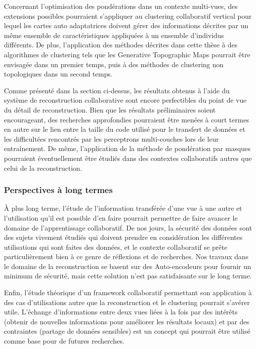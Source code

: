 Concernant l'optimisation des pondérations dans un contexte multi-vues, des extensions possibles pourraient s'appliquer au clustering collaboratif vertical pour lequel les cartes auto adaptatrices doivent gérer des informations décrites par un m\^{e}me ensemble de caractéristiques appliquées à un ensemble d'individus différents. De plus, l'application des méthodes décrites dans cette thèse à des algorithmes de clustering tels que les Generative Topographic Maps pourrait \^{e}tre envisagée dans un premier temps, puis à des méthodes de clustering non topologiques dans un second temps.

Comme présenté dans la section ci-dessus, les résultats obtenus à l'aide du système de reconstruction collaborative sont encore perfectibles du point de vue du détail de reconstruction. Bien que les résultats préliminaires soient encourageant, des recherches approfondies pourraient \^{e}tre menées à court termes en autre sur le lien entre la taille du code utilisé pour le transfert de données et les difficultées rencontrés par les perceptrons multi-couches lors de leur entraînement. De m\^{e}me, l'application de la méthode de pondération par masques pourraient éventuellement \^{e}tre étudiés dans des contextes collaboratifs autres que celui de la reconstruction.

\subsubsection{Perspectives à long termes}
À plus long terme, l'étude de l'information transférée d'une vue à une autre et l'utilisation qu'il est possible d'en faire pourrait permettre de faire avancer le domaine de l'apprentissage collaboratif. De nos jours, la sécurité des données sont des sujets vivement étudiés qui doivent prendre en considération les différentes utilisations qui sont faites des données, et le contexte collaboratif se pr\^{e}te particulièrement bien à ce genre de réflexions et de recherches. Nos travaux dans le domaine de la reconstruction se basent sur des Auto-encodeurs pour fournir un minimum de sécurité, mais cette solution n'est pas satisfaisante sur le long terme.

Enfin, l'étude théorique d'un framework collaboratif permettant son application à des cas d'utilisations autre que la reconstruction et le clustering pourrait s'avérer utile. L'échange d'informations entre deux vues liées à la fois par des intér\^{e}ts (obtenir de nouvelles informations pour améliorer les résultats locaux) et par des contraintes (partage de données sensibles) est un concept qui pourrait \^{e}tre utilisé comme base pour de futures recherches.


